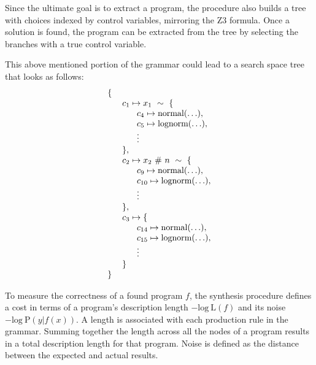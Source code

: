 \documentclass[letterpaper]{llncs}
\begin{document}
Since the ultimate goal is to extract a program, the procedure also 
builds a tree with choices indexed by control variables, mirroring the Z3 formula.
Once a solution is found, the program can be extracted from the tree by selecting
the branches with a true control variable.

This above mentioned portion of the grammar could lead to a search space tree that looks as follows:
\[
  \begin{array}{l }
    \{ \\
    \hspace{6mm} c_1 \mapsto x_1\ \sim\ \{ \\
        \hspace{12mm} c_4 \mapsto \text{normal}(\hdots), \\
        \hspace{12mm} c_5 \mapsto \text{lognorm}(\hdots), \\ 
        \hspace{12mm} \vdots \\
    \hspace{6mm}\},\\
    \hspace{6mm} c_2 \mapsto x_2\ \#\ n\ \sim\ \{ \\
        \hspace{12mm} c_9 \mapsto \text{normal}(\hdots), \\
        \hspace{12mm} c_{10} \mapsto \text{lognorm}(\hdots), \\ 
        \hspace{12mm} \vdots \\
    \hspace{6mm}\},\\
    \hspace{6mm} c_3 \mapsto \{ \\
        \hspace{12mm} c_{14} \mapsto \text{normal}(\hdots), \\
        \hspace{12mm} c_{15} \mapsto \text{lognorm}(\hdots), \\ 
        \hspace{12mm} \vdots \\
    \hspace{6mm}\}\\
    \}
    
  \end{array}
\]

To measure the correctness of a found program $f$, 
the synthesis procedure defines a cost in terms of a program's
description length $-\text{log}\ \text{L}(f)$ and its noise $-\text{log}\ \text{P}(y|f(x)) $.
A length is associated with each production rule in the grammar.
Summing together the length across all the nodes of a program results 
in a total description length for that program. 
Noise is defined as the distance between the expected and actual results.
\end{document}
